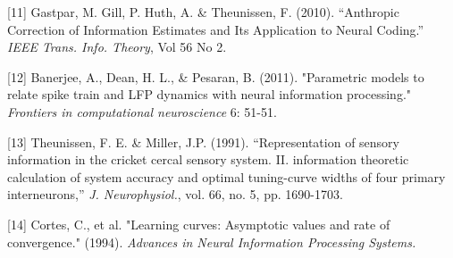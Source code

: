 \documentclass{article}
\begin{document}
[11] Gastpar, M.  Gill, P.  Huth, A. \& Theunissen, F. (2010). ``Anthropic
Correction of Information Estimates and Its Application to Neural
Coding.'' \emph{IEEE Trans. Info. Theory}, Vol 56 No 2.

[12] Banerjee, A., Dean, H. L.,  \& Pesaran, B. (2011). "Parametric
models to relate spike train and LFP dynamics with neural information
processing." \emph{Frontiers in computational neuroscience} 6: 51-51.

[13] Theunissen, F. E. \& Miller, J.P. (1991). ``Representation of sensory
information in the cricket cercal sensory system. II. information
theoretic calculation of system accuracy and optimal tuning-curve
widths of four primary interneurons,'' \emph{J. Neurophysiol.}, vol. 66,
no. 5, pp. 1690-1703.

[14] Cortes, C., et al. "Learning curves: Asymptotic values and rate of convergence." (1994). \emph{Advances in Neural Information Processing Systems.}
\end{document}
